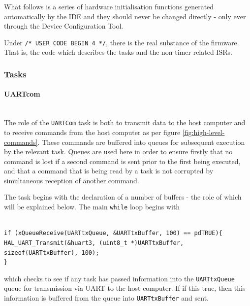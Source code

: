What follows is a series of hardware initialisation functions generated automatically by the IDE and they should never be changed directly - only ever through the Device Configuration Tool.

Under \verb|/* USER CODE BEGIN 4 */|, there is the real substance of the firmware. That is, the code which describes the tasks and the non-timer related ISRs.

\subsubsection{Tasks}

\paragraph{UARTcom}\\

The role of the \verb|UARTCom| task is both to transmit data to the host computer and to receive commands from the host computer as per figure \ref{fig:high-level-commands}. These commands are buffered into queues for subsequent execution by the relevant task. Queues are used here in order to ensure firstly that no command is lost if a second command is sent prior to the first being executed, and that a command that is being read by a task is not corrupted by simultaneous reception of another command.

The task begins with the declaration of a number of buffers - the role of which will be explained below. The main \verb|while| loop begins with


\begin{listing}
\begin{verbatim}

if (xQueueReceive(UARTtxQueue, &UARTtxBuffer, 100) == pdTRUE){
HAL_UART_Transmit(&huart3, (uint8_t *)UARTtxBuffer, sizeof(UARTtxBuffer), 100);
}

\end{verbatim}
\label{listing:ADC-calib}
\end{listing}

which checks to see if any task has passed information into the \verb|UARTtxQueue| queue for transmission via UART to the host computer. If if this true, then this information is buffered from the queue into \verb|UARTtxBuffer| and sent.

